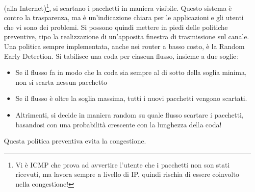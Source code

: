 (alla Internet)\footnote{Vi è ICMP che prova ad avvertire l’utente che i pacchetti non son stati ricevuti, ma lavora
sempre a livello di IP, quindi rischia di essere coinvolto nella congestione!}, si scartano i pacchetti in maniera
visibile. Questo sistema è contro la trasparenza, ma è un'indicazione chiara per le applicazioni e gli utenti che vi
sono dei problemi. Si possono quindi mettere in piedi delle politiche preventive, tipo la realizzazione di un'apposita
finestra di trasmissione sul canale.
Una politica sempre implementata, anche nei router a basso costo, è la Random Early Detection. Si tabilisce una coda 
per ciascun flusso, insieme a due soglie:
\begin{itemize}
 \item Se il flusso fa in modo che la coda sia sempre al di sotto della soglia minima, non si scarta nessun pacchetto
 \item Se il flusso è oltre la soglia massima, tutti i nuovi pacchetti vengono scartati.
 \item Altrimenti, si decide in maniera random su quale flusso scartare i pacchetti, basandosi con una probabilità
 crescente con la lunghezza della coda!
\end{itemize}
Questa politica preventiva evita la congestione.
